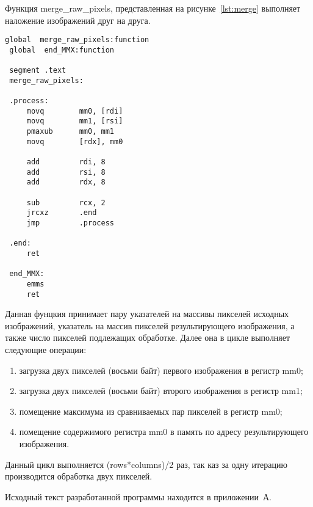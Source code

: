 Функция merge\_raw\_pixels, представленная на рисунке~\ref{lst:merge}
выполняет наложение изображений друг на друга.

\begin{lstlisting}[caption=Функция наложения изображений,
label=lst:merge,language={[x86masm]Assembler},basicstyle=\scriptsize\ttfamily]
 global  merge_raw_pixels:function
 global  end_MMX:function
     
 segment .text
 merge_raw_pixels:
     
 .process:    
     movq        mm0, [rdi]
     movq        mm1, [rsi]
     pmaxub      mm0, mm1
     movq        [rdx], mm0
 
     add         rdi, 8
     add         rsi, 8
     add         rdx, 8
     
     sub         rcx, 2
     jrcxz       .end
     jmp         .process
     
 .end:    
     ret
 
 end_MMX:
     emms
     ret
\end{lstlisting}

Данная фунцкия принимает пару указателей на массивы пикселей исходных изображений,
указатель на массив пикселей результирующего изображения, а также число пикселей
подлежащих обработке. Далее она в цикле выполняет следующие операции:
\begin{enumerate}
\item загрузка двух пикселей (восьми байт) первого изображения в регистр mm0;
\item загрузка двух пикселей (восьми байт) второго изображения в регистр mm1;
\item помещение максимума из сравниваемых пар пикселей в регистр mm0;
\item помещение содержимого регистра mm0 в память по адресу результирующего изображения.
\end{enumerate}

Данный цикл выполняется (rows*columns)/2 раз, 
так каз за одну итерацию производится обработка двух пикселей.

Исходный текст разработанной программы находится в приложении~А.
